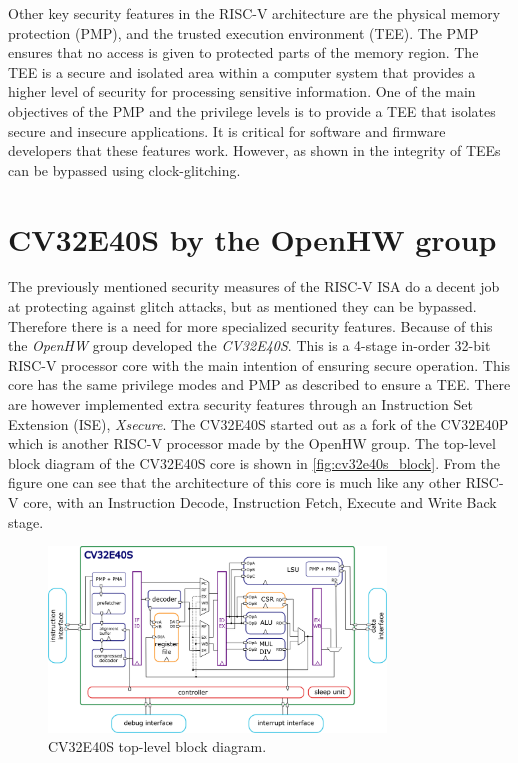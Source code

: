 Other key security features in the RISC-V architecture are the physical memory protection (PMP), and the trusted execution environment (TEE). The PMP ensures that no access is given to protected parts of the memory region. The TEE is a secure and isolated area within a computer system that provides a higher level of security for processing sensitive information. One of the main objectives of the PMP and the privilege levels is to provide a TEE that isolates secure and insecure applications. It is critical for software and firmware developers that these features work. However, as shown in \cite{source2} the integrity of TEEs can be bypassed using clock-glitching. 

\section{CV32E40S by the OpenHW group}
\label{sec:cv32}

The previously mentioned security measures of the RISC-V ISA do a decent job at protecting against glitch attacks, but as mentioned they can be bypassed. Therefore there is a need for more specialized security features. Because of this the \textit{OpenHW} group developed the \textit{CV32E40S}. This is a 4-stage in-order 32-bit RISC-V processor core with the main intention of ensuring secure operation\cite{cv32e40s_manual}. This core has the same privilege modes and PMP as described to ensure a TEE. There are however implemented extra security features through an Instruction Set Extension (ISE), \textit{Xsecure}. The CV32E40S started out as a fork of the CV32E40P which is another RISC-V processor made by the OpenHW group. The top-level block diagram of the CV32E40S core is shown in \autoref{fig:cv32e40s_block}. From the figure one can see that the architecture of this core is much like any other RISC-V core, with an Instruction Decode, Instruction Fetch, Execute and Write Back stage. 


\begin{figure}[h!]
    \centering
    \includegraphics[width=0.8\textwidth]{docs/images/CV32E40S_Block_Diagram.png}
    \caption{CV32E40S top-level block diagram\cite{cv32e40s_manual}.}
    \label{fig:cv32e40s_block}
\end{figure}

